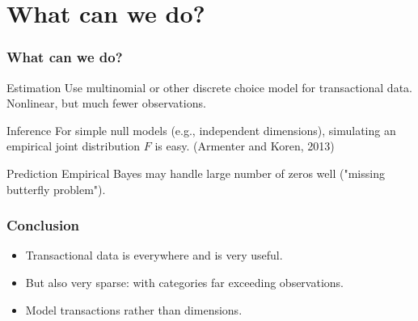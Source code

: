 \documentclass[compress,mathserif]{beamer}
\begin{document}
\section{What can we do?}\hypertarget{What can we do?}{}
\begin{frame}\frametitle{What can we do?}\hypertarget{What can we do?}{}
\begin{block}{Estimation}\hypertarget{Estimation}{}
Use multinomial or other discrete choice model for transactional data. Nonlinear, but much fewer observations.
\pause


\end{block}
\begin{block}{Inference}\hypertarget{Inference}{}
For simple null models (e.g., independent dimensions), simulating an empirical joint distribution $F$ is easy. (Armenter and Koren, 2013)
\pause


\end{block}
\begin{block}{Prediction}\hypertarget{Prediction}{}
Empirical Bayes may handle large number of zeros well ("missing butterfly problem").


\end{block}
\end{frame}



\begin{frame}\frametitle{Conclusion}\hypertarget{Conclusion}{}
\begin{itemize}
\item Transactional data is everywhere and is very useful.

\item But also very sparse: with categories far exceeding observations.

\item Model transactions rather than dimensions.
\end{itemize}
\end{frame}
\end{document}

